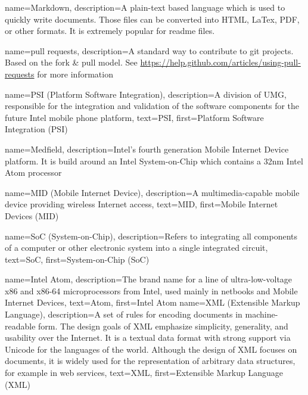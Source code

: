 {
  name=Markdown,
  description={A plain-text based language which is used to quickly write documents.
  Those files can be converted into HTML, LaTex, PDF, or other formats.
  It is extremely popular for readme files.}
}

{
  name=pull requests,
  description={A standard way to contribute to git projects. Based on the fork \& pull model.
  See \url{https://help.github.com/articles/using-pull-requests} for more information}
}

{
  name=PSI (Platform Software Integration),
  description={A division of UMG, responsible for the integration and
    validation of the software components for the future Intel mobile
    phone platform},
  text=PSI,
  first=Platform Software Integration (PSI)
}

{
  name=Medfield,
  description={Intel's fourth generation Mobile Internet Device
    platform. It is build around an Intel System-on-Chip which
    contains a 32nm Intel Atom\textsuperscript{\texttrademark}
    processor}
}

{
  name=MID (Mobile Internet Device),
  description={A multimedia-capable mobile device providing wireless
    Internet access},
  text=MID,
  first=Mobile Internet Devices (MID)
}

{
  name=SoC (System-on-Chip),
  description={Refers to integrating all components of a computer or
    other electronic system into a single integrated circuit},
  text=SoC,
  first=System-on-Chip (SoC)
}


{
  name=Intel Atom\textsuperscript{\texttrademark},
  description={The brand name for a line of ultra-low-voltage x86 and
    x86-64 microprocessors from Intel, used mainly in netbooks and
    Mobile Internet Devices},
  text=Atom,
  first=Intel Atom\textsuperscript{\texttrademark}
}
{
  name=XML (Extensible Markup Language),
  description={A set of rules for encoding documents in
    machine-readable form. The design goals of XML emphasize
    simplicity, generality, and usability over the Internet. It is a
    textual data format with strong support via Unicode for the
    languages of the world. Although the design of XML focuses on
    documents, it is widely used for the representation of arbitrary
    data structures, for example in web services},
  text=XML,
  first=Extensible Markup Language (XML)
}

